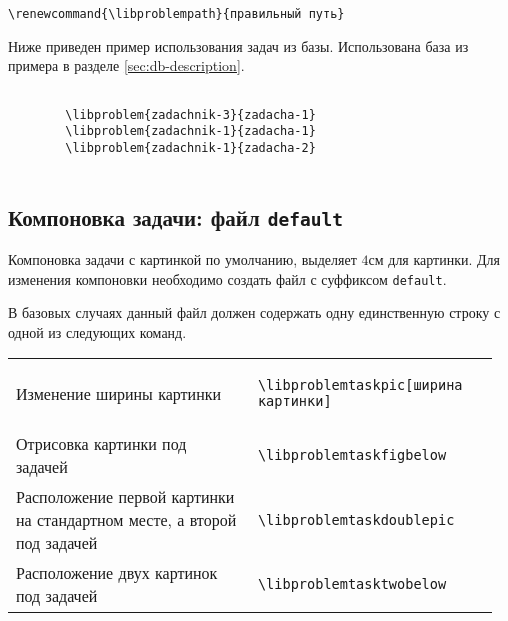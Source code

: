 \begin{lstlisting}[gobble = 3]
    \renewcommand{\libproblempath}{правильный путь}
\end{lstlisting}

Ниже приведен пример использования задач из базы. Использована база из примера в разделе
\ref{sec:db-description}.


\begin{lstlisting}[gobble = 3]
    
        \libproblem{zadachnik-3}{zadacha-1}
        \libproblem{zadachnik-1}{zadacha-1}
        \libproblem{zadachnik-1}{zadacha-2}
    
\end{lstlisting}




\subsection{Компоновка задачи: файл \texttt{default}}
\label{sec:db-default}

Компоновка задачи с картинкой по умолчанию, выделяет $4\unit{см}$ для картинки. Для изменения компоновки
необходимо создать файл с суффиксом \texttt{default}.

В базовых случаях данный файл должен содержать одну единственную строку с одной из следующих команд.

\noindent
\begin{tabular}{S{0.48\linewidth} S{0.485\linewidth}}
    Изменение ширины картинки &
        \begin{lstlisting}[style = listtable, gobble = 10]
            \libproblemtaskpic[ширина картинки]
        \end{lstlisting} \\
    Отрисовка картинки под задачей &
        \begin{lstlisting}[style = listtable, gobble = 10]
            \libproblemtaskfigbelow
        \end{lstlisting} \\
    Расположение первой картинки на стандартном месте, а второй под задачей &
        \begin{lstlisting}[style = listtable, gobble = 10]
            \libproblemtaskdoublepic
        \end{lstlisting} \\
    Расположение двух картинок под задачей &
        \begin{lstlisting}[style = listtable, gobble = 10]
            \libproblemtasktwobelow
        \end{lstlisting}
\end{tabular}


